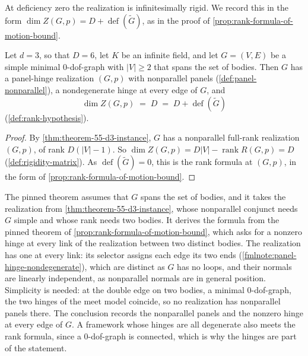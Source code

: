 At deficiency zero the realization is infinitesimally rigid. We record
this in the form $\dim Z(G,p) = D + \operatorname{def}(\tilde G)$, as in
the proof of \cref{prop:rank-formula-of-motion-bound}.

\begin{corollary}[The rank formula at deficiency zero from KT Theorem 5.5 ($d = 3$)]
  \label{cor:theorem-55-d3-spanning}
  \leanok
  Let $d = 3$, so that $D = 6$, let $K$ be an infinite field, and let
  $G = (V, E)$ be a simple minimal $0$-dof-graph with $|V| \ge 2$ that spans the set of bodies.
  Then $G$ has a panel-hinge realization $(G,p)$ with nonparallel panels
  (\cref{def:panel-nonparallel}), a nondegenerate hinge at every edge of
  $G$, and
  \[
    \dim Z(G,p) \;=\; D \;=\; D + \operatorname{def}(\tilde G)
  \]
  (\cref{def:rank-hypothesis}).
\end{corollary}
\begin{proof}
  \leanok
  By \cref{thm:theorem-55-d3-instance}, $G$ has a nonparallel full-rank
  realization $(G,p)$, of rank $D(|V| - 1)$. So
  $\dim Z(G,p) = D|V| - \operatorname{rank} R(G,p) = D$
  (\cref{def:rigidity-matrix}). As $\operatorname{def}(\tilde G) = 0$,
  this is the rank formula at $(G,p)$, in the form of
  \cref{prop:rank-formula-of-motion-bound}.
\end{proof}

\begin{fmlnote}
  \label{fmlnote:endpoint-selector-totality}
  The pinned theorem assumes that $G$ spans the set of bodies, and it
  takes the realization from \cref{thm:theorem-55-d3-instance}, whose
  nonparallel conjunct needs $G$ simple and whose rank needs two
  bodies. It derives the formula from the pinned theorem of
  \cref{prop:rank-formula-of-motion-bound}, which asks for a nonzero hinge at
  every link of the realization between two distinct bodies. The
  realization has one at every link: its selector
  assigns each edge its two ends
  (\cref{fmlnote:panel-hinge-nondegenerate}), which are distinct as $G$
  has no loops, and their normals are linearly independent, as nonparallel
  normals are in general position. Simplicity is needed: at the double edge
  on two bodies, a minimal $0$-dof-graph, the two hinges of the meet model
  coincide, so no realization has nonparallel panels there. The conclusion
  records the nonparallel panels and the nonzero hinge at every edge of
  $G$. A framework whose hinges are all degenerate also meets the rank
  formula, since a $0$-dof-graph is connected, which is why the hinges are
  part of the statement.
\end{fmlnote}

